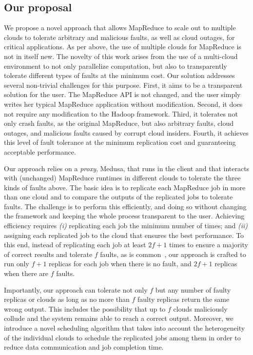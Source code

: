 \documentclass[10pt, conference, compsocconf]{IEEEtran}
\begin{document}
\subsection{Our proposal}

We propose a novel approach that allows MapReduce to scale out to multiple clouds to tolerate arbitrary and malicious faults, as well as cloud outages, for critical applications.
As per above, the use of multiple clouds for MapReduce is not in itself new.
The novelty of this work arises from the use of a multi-cloud environment to not only parallelize computation, but also to transparently tolerate different types of faults at the minimum cost.
Our solution addresses several non-trivial challenges for this purpose.
First, it aims to be a transparent solution for the user.
The MapReduce API is not changed, and the user simply writes her typical MapReduce application without modification.
Second, it does not require any modification to the Hadoop framework.
Third, it tolerates not only crash faults, as the original MapReduce, but also arbitrary faults, cloud outages, and malicious faults caused by corrupt cloud insiders.
Fourth, it achieves this level of fault tolerance at the minimum replication cost and guaranteeing acceptable performance.

Our approach relies on a \emph{proxy}, Medusa, that runs in the client and that interacts with (unchanged) MapReduce runtimes in different clouds to tolerate the three kinds of faults above.
The basic idea is to replicate each MapReduce job in more than one cloud and to compare the outputs of the replicated jobs to tolerate faults.
The challenge is to perform this efficiently, and doing so without changing the framework and keeping the whole process transparent to the user.
Achieving efficiency requires \textit{(i)} replicating each job the minimum number of times; and \textit{(ii)} assigning each replicated job to the cloud that ensures the best performance.
To this end, instead of replicating each job at least $2f + 1$ times to ensure a majority of correct results and tolerate $f$ faults, as is common~\cite{Sch90, Veronese:13}, our approach is crafted to run only $f+1$ replicas for each job when there is no fault, and $2f+1$ replicas when there are $f$ faults.

Importantly, our approach can tolerate not only $f$ but any number of faulty replicas or clouds as long as no more than $f$ faulty replicas return the same wrong output.
This includes the possibility that up to $f$ clouds maliciously collude and the system remains able to reach a correct output.
Moreover, we introduce a novel scheduling algorithm that takes into account the heterogeneity of the individual clouds to schedule the replicated jobs among them in order to reduce data communication and job completion time.
\end{document}
